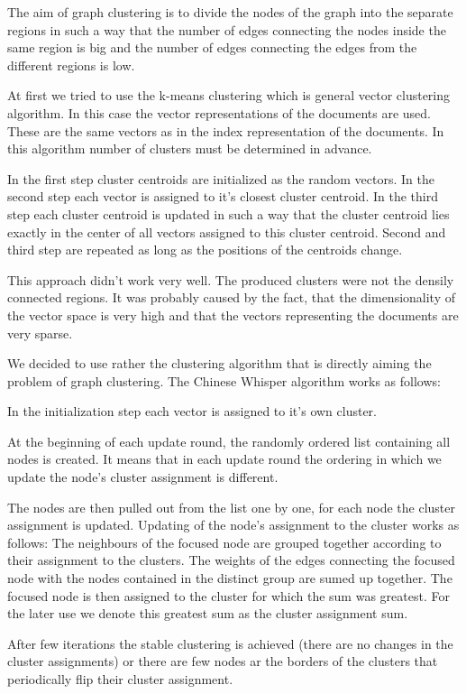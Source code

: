 The aim of graph clustering is to divide the nodes of the graph into the separate regions in such a way that the number of edges connecting the nodes inside the same region is big and the number of edges connecting the edges from the different regions is low.

At first we tried to use the k-means clustering which is general vector clustering algorithm. In this case the vector representations of the documents are used. These are the same vectors as in the index representation of the documents. In this algorithm number of clusters must be determined in advance. 

In the first step cluster centroids are initialized as the random vectors. 
In the second step each vector is assigned to it's closest cluster centroid.
In the third step each cluster centroid is updated in such a way that the cluster centroid lies exactly in the center of all vectors assigned to this cluster centroid.
Second and third step are repeated as long as the positions of the centroids change.
 
This approach didn't work very well. The produced clusters were not the densily connected regions. It was probably caused by the fact, that the dimensionality of the vector space is very high and that the vectors representing the documents are very sparse.


We decided to use rather the clustering algorithm that is directly aiming the problem of graph clustering.
The Chinese Whisper algorithm works as follows:

In the initialization step each vector is assigned to it's own cluster.

At the beginning of each update round, the randomly ordered list containing all nodes is created. It means that in each update round the ordering in which we update the node's cluster assignment is different.

The nodes are then pulled out from the list one by one, for each node the cluster assignment is updated. Updating of the node's assignment to the cluster works as follows: The neighbours of the focused node are grouped together according to their assignment to the clusters. The weights of the edges connecting the focused node with the nodes contained in the distinct group are sumed up together. The focused node is then assigned to the cluster for which the sum was greatest. For the later use we denote this greatest sum as the cluster assignment sum.

After few iterations the stable clustering is achieved (there are no changes in the cluster assignments) or there are few nodes ar the borders of the clusters that periodically flip their cluster assignment.

